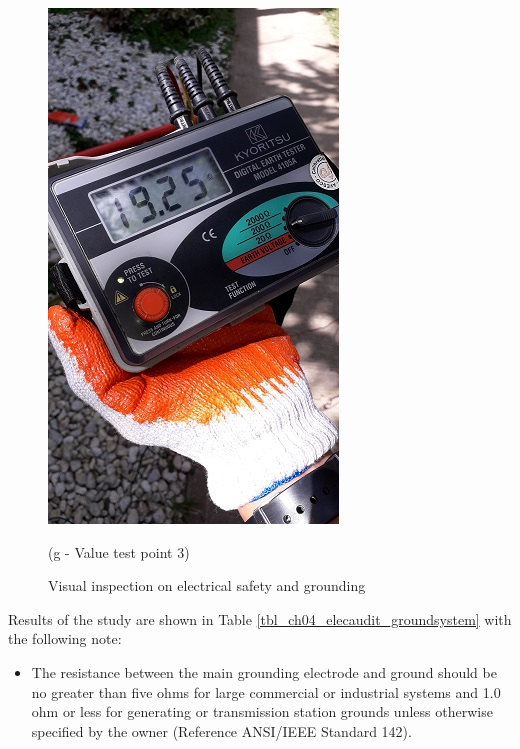 \begin{figure}
\begin{minipage}[b]{0.22\linewidth}
	\includegraphics[width=\textwidth]{figures/R1P_grounding/reading3.jpg}
	\caption*{(g - Value test point 3)}
\end{minipage}
	\caption{Visual inspection on electrical safety and grounding}
	\label{ch04_fig_grounding} 
\end{figure}

Results of the study are shown in Table \ref{tbl_ch04_elecaudit_groundsystem} with the following note:

\begin{itemize}
\item The resistance between the main grounding electrode and ground should be no greater
than five ohms for large commercial or industrial systems and 1.0 ohm or less for generating or transmission station grounds unless otherwise specified by the owner (Reference ANSI/IEEE Standard 142).

\end{itemize}








